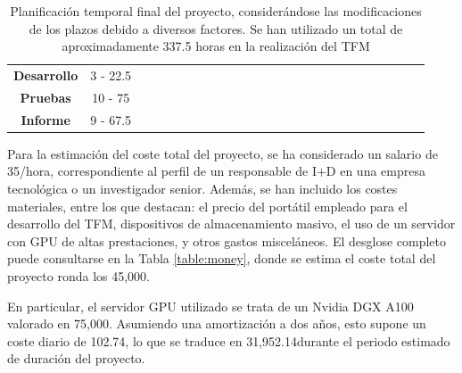 \begin{table}[h]
{\begin{tabular}{|c|c|ccccccccccccccccccccccc}
    \textbf{Desarrollo} & 3 - 22.5 & \cellcolor[HTML]{FFCCC9} &  & \cellcolor[HTML]{FFCCC9} &  & \cellcolor[HTML]{FFCCC9} &  &  &  &  &  &  &  &  &  &  &  &  &  &  &  &  & \multicolumn{1}{c|}{} &  \\ \cline{1-24}
    \textbf{Pruebas} & 10 - 75 &  & \cellcolor[HTML]{FFCCC9} &  & \cellcolor[HTML]{FFCCC9} &  & \cellcolor[HTML]{FFCCC9} & \cellcolor[HTML]{FFCCC9} & \cellcolor[HTML]{FFCCC9} & \cellcolor[HTML]{FFCCC9} & \cellcolor[HTML]{FFCCC9} & \cellcolor[HTML]{FFCCC9} & \cellcolor[HTML]{FFCCC9} & \cellcolor[HTML]{FFCCC9} &  &  &  &  &  &  &  &  & \multicolumn{1}{c|}{} &  \\ \cline{1-24}
    \textbf{Informe} & 9 - 67.5 &  &  &  &  &  &  &  &  &  &  &  &  &  & \cellcolor[HTML]{FFCCC9} & \cellcolor[HTML]{FFCCC9} & \cellcolor[HTML]{FFCCC9} & \cellcolor[HTML]{FFCCC9} & \cellcolor[HTML]{FFCCC9} & \cellcolor[HTML]{FFCCC9} & \cellcolor[HTML]{FFCCC9} & \cellcolor[HTML]{FFCCC9} & \multicolumn{1}{c|}{\cellcolor[HTML]{FFCCC9}} &  \\ \cline{1-24}
\end{tabular}%
}
\caption[Planificación temporal final del proyecto]{Planificación temporal final del proyecto, considerándose las modificaciones de los plazos debido a diversos factores. Se han utilizado un total de aproximadamente 337.5 horas en la realización del TFM}
\label{table:plan2}
\end{table}

Para la estimación del coste total del proyecto, se ha considerado un salario de 35\officialeuro/hora, correspondiente al perfil de un responsable de I+D en una empresa tecnológica o un investigador senior. Además, se han incluido los costes materiales, entre los que destacan: el precio del portátil empleado para el desarrollo del TFM, dispositivos de almacenamiento masivo, el uso de un servidor con GPU de altas prestaciones, y otros gastos misceláneos. El desglose completo puede consultarse en la Tabla \ref{table:money}, donde se estima el coste total del proyecto ronda los 45,000\officialeuro.

En particular, el servidor GPU utilizado se trata de un Nvidia DGX A100 valorado en 75,000\officialeuro. Asumiendo una amortización a dos años, esto supone un coste diario de 102.74\officialeuro, lo que se traduce en 31,952.14\officialeuro\space durante el periodo estimado de duración del proyecto.

